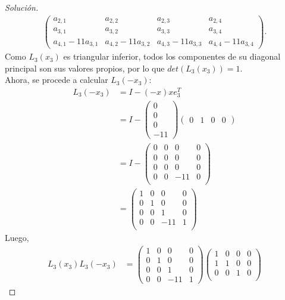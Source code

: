 \documentclass[12pt]{book}
\newenvironment{solucion}
  {\renewcommand\qedsymbol{$\square$}\begin{proof}[Solución]}
  {\end{proof}}
\begin{document}
\begin{solucion}
\begin{align*}
\begin{pmatrix}
    a_{2,1} & a_{2,2} & a_{2,3} & a_{2,4}\\
    a_{3,1} & a_{3,2} & a_{3,3} & a_{3,4}\\
    a_{4,1}-11a_{3,1} & a_{4,2}-11a_{3,2} & a_{4,3}-11a_{3,3} & a_{4,4}-11a_{3,4}
    \end{pmatrix}.
\end{align*}
Como $L_3(x_3)$ es triangular inferior, todos los componentes de su diagonal principal son sus valores propios, por lo que $det\left(L_3(x_3)\right)=1$.\\
Ahora, se procede a calcular $L_3(-x_3)$:
\begin{align*}
    L_3(-x_3)&=I-(-x)xe_3^T\\
    &=I-\begin{pmatrix}
    0\\
    0\\
    0\\
    -11
    \end{pmatrix}\begin{pmatrix}
    0 & 1 & 0 & 0
    \end{pmatrix}\\[8pt]
    &= I-\begin{pmatrix}
    0 & 0 & 0 & 0\\
    0 & 0 & 0 & 0\\
    0 & 0 & 0 & 0\\
    0 & 0 & -11 & 0\\
    \end{pmatrix}\\[8pt]
    &=\begin{pmatrix}
    1 & 0 & 0 & 0\\
    0 & 1 & 0 & 0\\
    0 & 0 & 1 & 0\\
    0 & 0 & -11 & 1\\
    \end{pmatrix}
\end{align*}
Luego,
\begin{align*}
    L_3(x_3)L_3(-x_3)&=\begin{pmatrix}
    1 & 0 & 0 & 0\\
    0 & 1 & 0 & 0\\
    0 & 0 & 1 & 0\\
    0 & 0 & -11 & 1
    \end{pmatrix}\begin{pmatrix}
    1 & 0 & 0 & 0\\
    1 & 1 & 0 & 0\\
    0 & 0 & 1 & 0\\

\end{pmatrix}
\end{align*}
\end{solucion}
\end{document}
